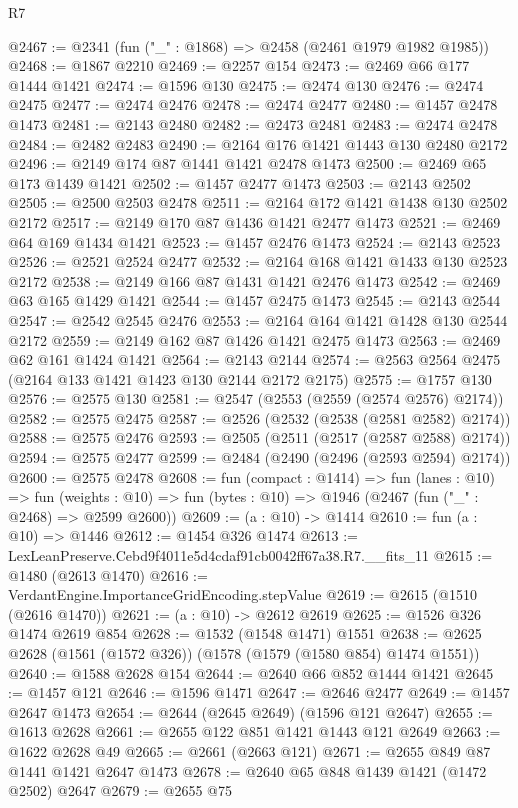 \begin{lexlean}{R7}
\begin{coremodule}
@2467 := @2341 (fun ("_" : @1868) => @2458 (@2461 @1979 @1982 @1985))
@2468 := @1867 @2210
@2469 := @2257 @154
@2473 := @2469 @66 @177 @1444 @1421
@2474 := @1596 @130
@2475 := @2474 @130
@2476 := @2474 @2475
@2477 := @2474 @2476
@2478 := @2474 @2477
@2480 := @1457 @2478 @1473
@2481 := @2143 @2480
@2482 := @2473 @2481
@2483 := @2474 @2478
@2484 := @2482 @2483
@2490 := @2164 @176 @1421 @1443 @130 @2480 @2172
@2496 := @2149 @174 @87 @1441 @1421 @2478 @1473
@2500 := @2469 @65 @173 @1439 @1421
@2502 := @1457 @2477 @1473
@2503 := @2143 @2502
@2505 := @2500 @2503 @2478
@2511 := @2164 @172 @1421 @1438 @130 @2502 @2172
@2517 := @2149 @170 @87 @1436 @1421 @2477 @1473
@2521 := @2469 @64 @169 @1434 @1421
@2523 := @1457 @2476 @1473
@2524 := @2143 @2523
@2526 := @2521 @2524 @2477
@2532 := @2164 @168 @1421 @1433 @130 @2523 @2172
@2538 := @2149 @166 @87 @1431 @1421 @2476 @1473
@2542 := @2469 @63 @165 @1429 @1421
@2544 := @1457 @2475 @1473
@2545 := @2143 @2544
@2547 := @2542 @2545 @2476
@2553 := @2164 @164 @1421 @1428 @130 @2544 @2172
@2559 := @2149 @162 @87 @1426 @1421 @2475 @1473
@2563 := @2469 @62 @161 @1424 @1421
@2564 := @2143 @2144
@2574 := @2563 @2564 @2475 (@2164 @133 @1421 @1423 @130 @2144 @2172 @2175)
@2575 := @1757 @130
@2576 := @2575 @130
@2581 := @2547 (@2553 (@2559 (@2574 @2576) @2174))
@2582 := @2575 @2475
@2587 := @2526 (@2532 (@2538 (@2581 @2582) @2174))
@2588 := @2575 @2476
@2593 := @2505 (@2511 (@2517 (@2587 @2588) @2174))
@2594 := @2575 @2477
@2599 := @2484 (@2490 (@2496 (@2593 @2594) @2174))
@2600 := @2575 @2478
@2608 := fun (compact : @1414) =>
  fun (lanes : @10) =>
  fun (weights : @10) => fun (bytes : @10) => @1946 (@2467 (fun ("_" : @2468) => @2599 @2600))
@2609 := (a : @10) -> @1414
@2610 := fun (a : @10) => @1446
@2612 := @1454 @326 @1474
@2613 := LexLeanPreserve.Cebd9f4011e5d4cdaf91cb0042ff67a38.R7.__fits_11
@2615 := @1480 (@2613 @1470)
@2616 := VerdantEngine.ImportanceGridEncoding.stepValue
@2619 := @2615 (@1510 (@2616 @1470))
@2621 := (a : @10) -> @2612 @2619
@2625 := @1526 @326 @1474 @2619 @854
@2628 := @1532 (@1548 @1471) @1551
@2638 := @2625 @2628 (@1561 (@1572 @326)) (@1578 (@1579 (@1580 @854) @1474 @1551))
@2640 := @1588 @2628 @154
@2644 := @2640 @66 @852 @1444 @1421
@2645 := @1457 @121
@2646 := @1596 @1471
@2647 := @2646 @2477
@2649 := @1457 @2647 @1473
@2654 := @2644 (@2645 @2649) (@1596 @121 @2647)
@2655 := @1613 @2628
@2661 := @2655 @122 @851 @1421 @1443 @121 @2649
@2663 := @1622 @2628 @49
@2665 := @2661 (@2663 @121)
@2671 := @2655 @849 @87 @1441 @1421 @2647 @1473
@2678 := @2640 @65 @848 @1439 @1421 (@1472 @2502) @2647
@2679 := @2655 @75

\end{coremodule}
\end{lexlean}
